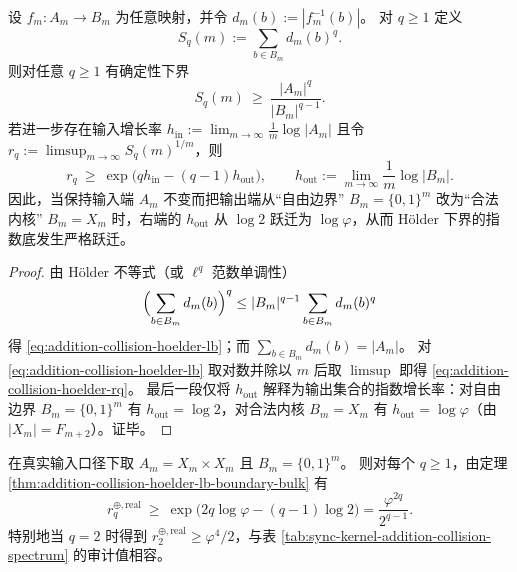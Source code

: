 \begin{theorem}\label{thm:addition-collision-hoelder-lb-boundary-bulk}
设 \(f_m:A_m\to B_m\) 为任意映射，并令 \(d_m(b):=|f_m^{-1}(b)|\)。
对 \(q\ge 1\) 定义
\[
S_q(m):=\sum_{b\in B_m} d_m(b)^q.
\]
则对任意 \(q\ge 1\) 有确定性下界
\begin{equation}\label{eq:addition-collision-hoelder-lb}
S_q(m)\ \ge\ \frac{|A_m|^q}{|B_m|^{q-1}}.
\end{equation}
若进一步存在输入增长率 \(h_{\mathrm{in}}:=\lim_{m\to\infty}\frac1m\log|A_m|\) 且令
\(
r_q:=\limsup_{m\to\infty} S_q(m)^{1/m}
\)，则
\begin{equation}\label{eq:addition-collision-hoelder-rq}
r_q\ \ge\ \exp\!\bigl(qh_{\mathrm{in}}-(q-1)h_{\mathrm{out}}\bigr),
\qquad
h_{\mathrm{out}}:=\lim_{m\to\infty}\frac1m\log|B_m|.
\end{equation}
因此，当保持输入端 \(A_m\) 不变而把输出端从“自由边界” \(B_m=\{0,1\}^m\) 改为“合法内核” \(B_m=X_m\) 时，右端的 \(h_{\mathrm{out}}\) 从 \(\log 2\) 跃迁为 \(\log\varphi\)，从而 Hölder 下界的指数底发生严格跃迁。
\end{theorem}

\begin{proof}
由 Hölder 不等式（或 \(\ell^q\) 范数单调性）
\[
\Bigl(\sum_{b\in B_m} d_m(b)\Bigr)^q\le |B_m|^{q-1}\sum_{b\in B_m} d_m(b)^q
\]
得 \eqref{eq:addition-collision-hoelder-lb}；而 \(\sum_{b\in B_m}d_m(b)=|A_m|\)。
对 \eqref{eq:addition-collision-hoelder-lb} 取对数并除以 \(m\) 后取 \(\limsup\) 即得 \eqref{eq:addition-collision-hoelder-rq}。
最后一段仅将 \(h_{\mathrm{out}}\) 解释为输出集合的指数增长率：对自由边界 \(B_m=\{0,1\}^m\) 有 \(h_{\mathrm{out}}=\log 2\)，对合法内核 \(B_m=X_m\) 有 \(h_{\mathrm{out}}=\log\varphi\)（由 \(|X_m|=F_{m+2}\)）。证毕。
\end{proof}

\begin{corollary}[真实输入加法投影的熵式下界]\label{cor:addition-collision-real-hoelder-lb}
在真实输入口径下取 \(A_m=X_m\times X_m\) 且 \(B_m=\{0,1\}^m\)。
则对每个 \(q\ge 1\)，由定理 \ref{thm:addition-collision-hoelder-lb-boundary-bulk} 有
\[
r_q^{\oplus,\mathrm{real}}\ \ge\ \exp\!\bigl(2q\log\varphi-(q-1)\log 2\bigr)=\frac{\varphi^{2q}}{2^{q-1}}.
\]
特别地当 \(q=2\) 时得到
\(
r^{\oplus,\mathrm{real}}_2\ge \varphi^4/2
\)，与表 \ref{tab:sync-kernel-addition-collision-spectrum} 的审计值相容。
\end{corollary}

